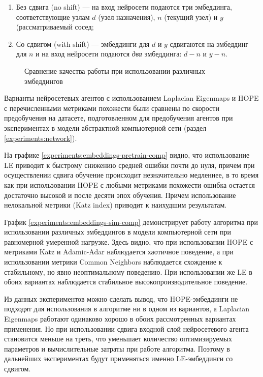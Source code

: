 \documentclass[specification,annotation,times]{itmo-student-thesis}
\theoremstyle{definition}
\begin{document}
\begin{enumerate}
\item Без сдвига (no shift) --- на вход нейросети подаются три эмбеддинга,
  соответствующие узлам $d$ (узел назначения), $n$ (текущий узел) и $y$
  (рассматриваемый сосед;
\item Со сдвигом (with shift) --- эмбеддинги для $d$ и $y$ сдвигаются на
  эмбеддинг для $n$ и на вход нейросети подаются \textit{два} эмбеддинга:
  $d - n$ и $y - n$.
\end{enumerate}

\begin{figure}[!h]
  \centering
  \hfil
  \caption{Сравнение качества работы при использовании различных
    эмбеддингов}\label{experiments:embeddings-comp}
\end{figure}

Варианты нейросетевых агентов с использованием Laplacian Eigenmaps и HOPE с
перечисленными метриками похожести были сравнены по скорости предобучения на
датасете, подготовленном для предобучения агентов при экспериментах в модели
абстрактной компьютерной сети (раздел \ref{experiments:network}).

На графике \ref{experiments:embeddings-pretrain-comp} видно, что использование LE
приводит к быстрому снижению средней ошибки почти до нуля, причем при
осуществлении сдвига обучение происходит незначительно медленнее, в то время как
при использовании HOPE с любыми метриками похожести ошибка остается достаточно
высокой и после десяти эпох обучения. Причем использование нелокальной метрики
(Katz index) приводит к наихудшим результатам.

График \ref{experiments:embeddings-sim-comp} демонстрирует работу алгоритма при
использовании различных эмбеддингов в модели компьютерной сети при равномерной
умеренной нагрузке. Здесь видно, что при использовании HOPE с метриками Katz и
Adamic-Adar наблюдается хаотичное поведение, а при использовании метрики Common
Neighbors наблюдается схождение к стабильному, но явно неоптимальному поведению.
При использовании же LE в обоих вариантах наблюдается стабильное
высокопроизводительное поведение.

Из данных экспериментов можно сделать вывод, что HOPE-эмбеддинги не подходят для
использования в алгоритме ни в одном из вариантов, а Laplacian Eigenmaps
работают одинаково хорошо в обоих рассмотренных вариантах применения. Но при
использовании сдвига входной слой нейросетевого агента становится меньше на
треть, что уменьшает количество оптимизируемых параметров и вычислительные
затраты при работе алгоритма. Поэтому в дальнейших экспериментах будут
применяться именно LE-эмбеддинги со сдвигом.
\end{document}
